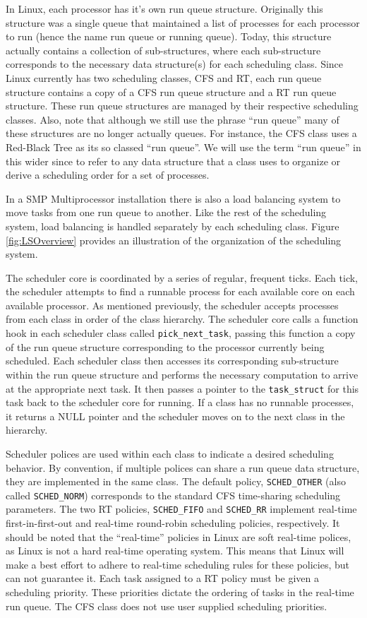 \documentclass[12pt]{article}
\begin{document}
In Linux, each processor has it's own run queue structure. Originally this
structure was a single queue that maintained a list of processes for
each processor to run (hence the name run queue or running queue).
Today, this structure actually contains a collection of
sub-structures, where each sub-structure corresponds to the necessary
data structure(s) for each scheduling class. Since Linux currently
has two scheduling classes, CFS and RT, each run queue structure
contains a copy of a CFS run queue structure and a RT run queue
structure. These
run queue structures are managed by their respective scheduling
classes. Also, note that although we still use the phrase ``run queue''
many of these structures are no longer actually queues. For instance, the CFS
class uses a Red-Black Tree as its so classed ``run queue''. We will
use the term ``run queue'' in this wider since to refer to any data
structure that a class uses to organize or derive a scheduling order for a
set of processes.

In a SMP Multiprocessor installation there is also a load balancing system
to move tasks from one run queue to another. Like the rest of the
scheduling system, load balancing is handled separately by each
scheduling class. Figure \ref{fig:LSOverview} provides an illustration
of the organization of the scheduling system.

The scheduler core is coordinated by a series of regular,
frequent ticks. Each tick, the scheduler attempts to find a runnable
process for each available core on each available processor. As
mentioned previously, the scheduler accepts processes from each class
in order of the class hierarchy. The scheduler core calls a function
hook in each scheduler class called \texttt{pick\_next\_task}, passing
this function a copy of the run queue structure corresponding to the
processor currently being scheduled. Each scheduler class then accesses its
corresponding sub-structure within the run queue structure and performs
the necessary computation to arrive at the appropriate next task. It then
passes a pointer to the \texttt{task\_struct} for this task back to the
scheduler core for
running. If a class has no runnable processes, it returns a NULL
pointer and the scheduler moves on to the next class in the hierarchy.

Scheduler polices are used within each class to indicate a desired
scheduling behavior. By convention, if multiple polices can share a run
queue data structure, they are implemented in the same class. The
default policy, \texttt{SCHED\_OTHER} (also called
\texttt{SCHED\_NORM}) corresponds to the standard CFS time-sharing
scheduling parameters. The two RT policies, \texttt{SCHED\_FIFO} and
\texttt{SCHED\_RR} implement real-time first-in-first-out and real-time
round-robin scheduling policies, respectively. It should be noted that
the ``real-time'' policies in Linux are soft real-time polices, as
Linux is not a hard real-time operating system. This means that Linux
will make a best effort to adhere to real-time scheduling rules for
these policies, but can not guarantee it. Each task assigned to a RT
policy must be given a scheduling priority. These priorities dictate the
ordering of tasks in the real-time run queue. The CFS class does not
use user supplied scheduling priorities.
\end{document}

